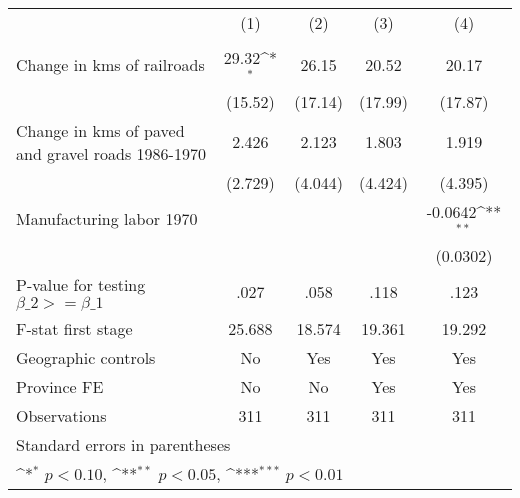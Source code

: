 {
\def\sym#1{\ifmmode^{#1}\else\(^{#1}\)\fi}
\begin{tabular}{l*{4}{c}}
\hline\hline
                &\multicolumn{1}{c}{(1)}&\multicolumn{1}{c}{(2)}&\multicolumn{1}{c}{(3)}&\multicolumn{1}{c}{(4)}\\
                &\multicolumn{1}{c}{}&\multicolumn{1}{c}{}&\multicolumn{1}{c}{}&\multicolumn{1}{c}{}\\
\hline
Change in kms of railroads&    29.32\sym{*}  &    26.15         &    20.52         &    20.17         \\
                &  (15.52)         &  (17.14)         &  (17.99)         &  (17.87)         \\
[1em]
Change in kms of paved and gravel roads 1986-1970&    2.426         &    2.123         &    1.803         &    1.919         \\
                &  (2.729)         &  (4.044)         &  (4.424)         &  (4.395)         \\
[1em]
Manufacturing labor 1970&                  &                  &                  &  -0.0642\sym{**} \\
                &                  &                  &                  & (0.0302)         \\
\hline
P-value for testing $\beta\_{2} >= \beta\_{1}$&     .027         &     .058         &     .118         &     .123         \\
F-stat first stage&   25.688         &   18.574         &   19.361         &   19.292         \\
Geographic controls&       No         &      Yes         &      Yes         &      Yes         \\
Province FE     &       No         &       No         &      Yes         &      Yes         \\
Observations    &      311         &      311         &      311         &      311         \\
\hline\hline
\multicolumn{5}{l}{\footnotesize Standard errors in parentheses}\\
\multicolumn{5}{l}{\footnotesize \sym{*} \(p<0.10\), \sym{**} \(p<0.05\), \sym{***} \(p<0.01\)}\\
\end{tabular}
}

